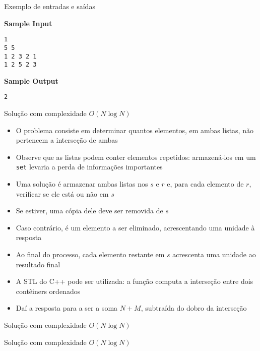 \begin{frame}[fragile]{Exemplo de entradas e saídas}

\begin{minipage}[t]{0.6\textwidth}
\textbf{Sample Input}
\begin{verbatim}
1
5 5
1 2 3 2 1
1 2 5 2 3
\end{verbatim}
\end{minipage}
\begin{minipage}[t]{0.35\textwidth}
\textbf{Sample Output}
\begin{verbatim}
2
\end{verbatim}
\end{minipage}
\end{frame}

\begin{frame}[fragile]{Solução com complexidade $O(N\log N)$}

    \begin{itemize}
        \item O problema consiste em determinar quantos elementos, em ambas listas, não
            pertencem a interseção de ambas

        \item Observe que as listas podem conter elementos repetidos: armazená-los em um
            \texttt{set} levaria a perda de informações importantes

        \item Uma solução é armazenar ambas listas nos  $s$ e $r$ e, para
            cada elemento de $r$, verificar se ele está ou não em $s$

        \item Se estiver, uma cópia dele deve ser removida de $s$

        \item Caso contrário, é um elemento a ser eliminado, acrescentando uma unidade à resposta

        \item Ao final do processo, cada elemento restante em $s$ acrescenta uma unidade ao
            resultado final

        \item A STL do C++ pode ser utilizada: a função  computa
            a interseção entre dois contêiners ordenados

        \item Daí a resposta para a ser a soma $N + M$, subtraída do dobro da interseção
   \end{itemize}

\end{frame}

\begin{frame}[fragile]{Solução com complexidade $O(N\log N)$}
\end{frame}

\begin{frame}[fragile]{Solução com complexidade $O(N\log N)$}
\end{frame}
